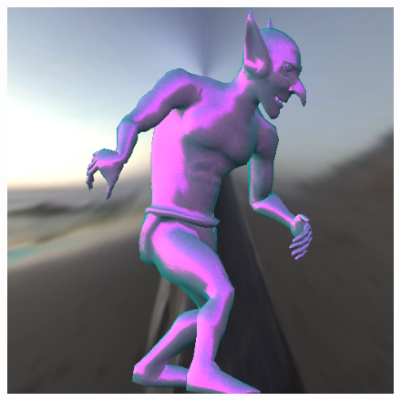 \begin{figure}[H]
\endminipage\hfill
{}%
  \includegraphics[width=\linewidth]{./Imagens/brdfs/blinn-phong-goblin.png}
\endminipage
\end{figure}

